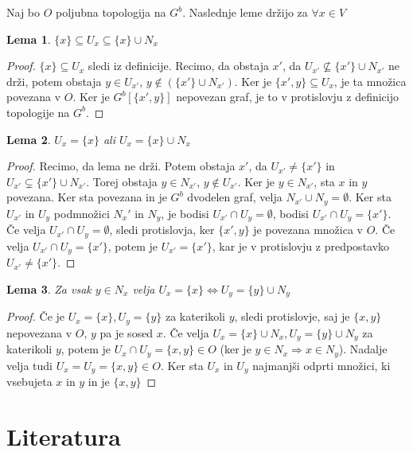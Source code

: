 \documentclass[mat1]{fmfdelo}
\newtheorem{lemma}{Lema}[subsection]
\begin{document}
Naj bo $O$ poljubna topologija na $G^b$. Naslednje leme držijo za $\forall x \in V$
\begin{lemma}
  $\{x\} \subseteq U_x \subseteq \{x\} \cup N_x$
\end{lemma}
\begin{proof}
  $\{x\} \subseteq U_x$ sledi iz definicije. Recimo, da obstaja $x'$, da
  $U_{x'} \nsubseteq \{x'\} \cup N_{x'}$ ne drži, potem obstaja
  $y \in U_{x'}$, $y \notin (\{x'\} \cup N_{x'})$. Ker je $\{x', y\} \subseteq U_x$,
  je ta množica povezana v $O$. Ker je $G^b[\{x',y\}]$ nepovezan graf, je to v
  protislovju z definicijo topologije na $G^b$.
\end{proof}
\begin{lemma}
  $U_x = \{x\}$ ali $U_x = \{x\} \cup N_x$
\end{lemma}
\begin{proof}
  Recimo, da lema ne drži. Potem obstaja $x'$, da $U_{x'} \neq \{x'\}$ in
  $U_{x'} \subsetneq \{x'\} \cup N_{x'}$. Torej obstaja $y \in N_{x'}$, $y \notin U_{x'}$.
  Ker je $y \in N_{x'}$, sta $x$ in $y$ povezana. Ker sta povezana in je $G^b$
  dvodelen graf, velja $N_{x'} \cup N_y = \emptyset$. Ker sta $U_{x'}$ in $U_y$ 
  podmnožici $N_x'$ in $N_y$, je bodisi $U_{x'} \cap U_y = \emptyset$,
  bodisi $U_{x'} \cap U_y = \{x'\}$. Če velja $U_{x'} \cap U_y = \emptyset$, sledi
  protislovja, ker $\{x',y\}$ je povezana množica v $O$.
  Če velja $U_{x'} \cap U_y = \{x'\}$, potem je $U_{x'} = \{x'\}$, kar je v
  protislovju z predpostavko $U_{x'} \neq \{x'\}$.
\end{proof}
\begin{lemma}
  Za vsak $y \in N_x$ velja $U_x = \{x\} \iff U_y = \{y\} \cup N_y$
\end{lemma}
\begin{proof}
Če je $U_x = \{x\}, U_y = \{y\}$ za katerikoli $y$, sledi protislovje, saj je 
$\{x,y\}$ nepovezana v $O$, $y$ pa je sosed $x$.
Če velja $U_x = \{x\} \cup N_x, U_y = \{y\} \cup N_y$ za katerikoli $y$, potem je
$U_x \cap U_y = \{x, y\} \in O$ (ker je $y \in N_x \Rightarrow x \in N_y$). Nadalje
velja tudi $U_x = U_y = \{x,y\} \in O$. Ker sta $U_x$ in $U_y$ najmanjši odprti
množici, ki vsebujeta $x$ in $y$ in je $\{x,y\}$ 
\end{proof}

\cleardoublepage
\section{Literatura}
\nocite{*}

\newpage
\end{document}
